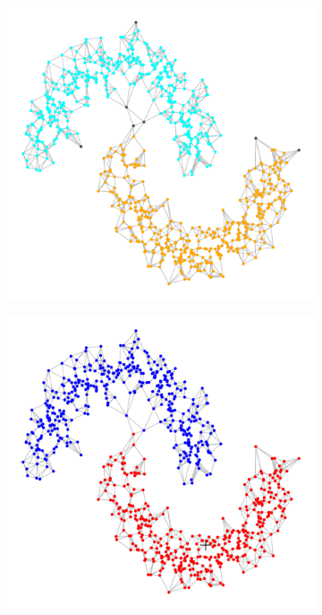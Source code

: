 \documentclass{article}
\newcommand{\1}{\mathbf{1}}
\theoremstyle{aldenthm}
\theoremstyle{aldenrmrk}
\begin{document}
\begin{figure}
	\centering
	\begin{adjustbox}{minipage=\linewidth,scale=0.8}
		\begin{subfigure}{.24\linewidth}
			\includegraphics[width=\linewidth,scale = .5]{example2plots/row1_true_density_cluster}
			\caption{}
		\end{subfigure}
		\begin{subfigure}{.24\linewidth}
			\includegraphics[width=\linewidth]{example2plots/row1_ppr_cluster}

\end{subfigure}
\end{adjustbox}
\end{figure}
\end{document}
